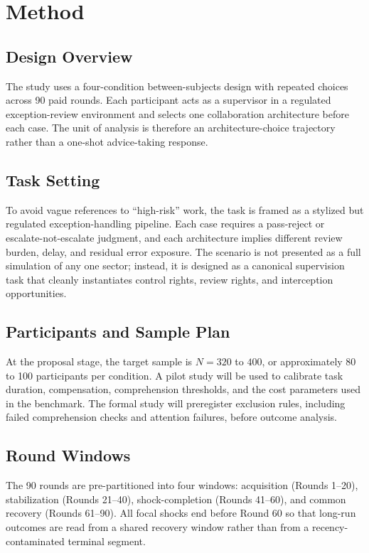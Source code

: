 \documentclass[man,natbib]{apa7}
\begin{document}
\section{Method}

\subsection{Design Overview}

The study uses a four-condition between-subjects design with repeated choices across 90 paid rounds. Each participant acts as a supervisor in a regulated exception-review environment and selects one collaboration architecture before each case. The unit of analysis is therefore an architecture-choice trajectory rather than a one-shot advice-taking response.

\subsection{Task Setting}

To avoid vague references to ``high-risk'' work, the task is framed as a stylized but regulated exception-handling pipeline. Each case requires a pass-reject or escalate-not-escalate judgment, and each architecture implies different review burden, delay, and residual error exposure. The scenario is not presented as a full simulation of any one sector; instead, it is designed as a canonical supervision task that cleanly instantiates control rights, review rights, and interception opportunities.

\subsection{Participants and Sample Plan}

At the proposal stage, the target sample is $N = 320$ to $400$, or approximately 80 to 100 participants per condition. A pilot study will be used to calibrate task duration, compensation, comprehension thresholds, and the cost parameters used in the benchmark. The formal study will preregister exclusion rules, including failed comprehension checks and attention failures, before outcome analysis.

\subsection{Round Windows}

The 90 rounds are pre-partitioned into four windows: acquisition (Rounds 1--20), stabilization (Rounds 21--40), shock-completion (Rounds 41--60), and common recovery (Rounds 61--90). All focal shocks end before Round 60 so that long-run outcomes are read from a shared recovery window rather than from a recency-contaminated terminal segment.
\end{document}

